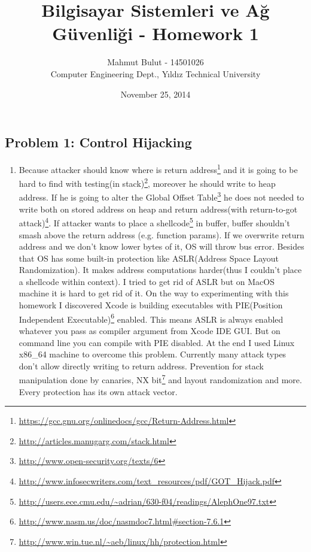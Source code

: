 \documentclass[11pt]{article}
\begin{document}
\title{ Bilgisayar Sistemleri ve Ağ Güvenliği - Homework 1 }
\date{November 25, 2014}
\author{Mahmut Bulut - 14501026\\ Computer Engineering Dept., Yıldız Technical University}

\maketitle
\subsection*{Problem 1: Control Hijacking}

\begin{enumerate}[\indent a)]
\item Because attacker should know where is return address\footnote{\url{https://gcc.gnu.org/onlinedocs/gcc/Return-Address.html}} and it is going to be hard to find with testing(in stack)\footnote{\url{http://articles.manugarg.com/stack.html}}, moreover he should write to heap address. If he is going to alter the Global Offset Table\footnote{\url{http://www.open-security.org/texts/6}} he does not needed to write both on stored address on heap and return address(with return-to-got attack)\footnote{\url{http://www.infosecwriters.com/text_resources/pdf/GOT_Hijack.pdf}}. If attacker wants to place a shellcode\footnote{\url{http://users.ece.cmu.edu/~adrian/630-f04/readings/AlephOne97.txt}} in buffer, buffer shouldn't smash above the return address (e.g. function params). If we overwrite return address and we don't know lower bytes of it, OS will throw bus error. Besides that OS has some built-in protection like ASLR(Address Space Layout Randomization). It makes address computations harder(thus I couldn't place a shellcode within context). I tried to get rid of ASLR but on MacOS machine it is hard to get rid of it. On the way to experimenting with this homework I discovered Xcode is building executables with PIE(Position Independent Executable)\footnote{\url{http://www.nasm.us/doc/nasmdoc7.html\#section-7.6.1}} enabled. This means ASLR is always enabled whatever you pass as compiler argument from Xcode IDE GUI. But on command line you can compile with PIE disabled. At the end I used Linux x86\_64 machine to overcome this problem. Currently many attack types don't allow directly writing to return address. Prevention for stack manipulation done by canaries, NX bit\footnote{\url{http://www.win.tue.nl/~aeb/linux/hh/protection.html}} and layout randomization and more. Every protection has its own attack vector.


\end{enumerate}
\end{document}
